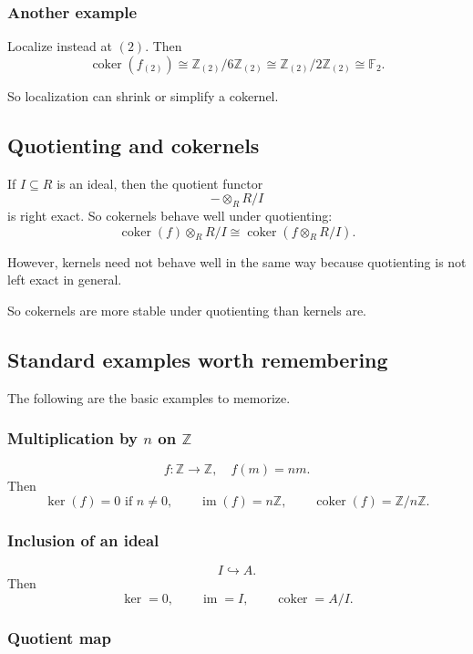 \documentclass[12pt,a4paper]{article}
\theoremstyle{notespace}
\theoremstyle{definition}
\begin{document}
\subsubsection*{Another example}

Localize instead at \((2)\). Then
\[
\operatorname{coker}(f_{(2)})\cong \mathbb Z_{(2)}/6\mathbb Z_{(2)}\cong \mathbb Z_{(2)}/2\mathbb Z_{(2)}\cong \mathbb F_2.
\]

So localization can shrink or simplify a cokernel.

\subsection{ Quotienting and cokernels}

If \(I\subseteq R\) is an ideal, then the quotient functor
\[
-\otimes_R R/I
\]
is right exact.
So cokernels behave well under quotienting:
\[
\operatorname{coker}(f)\otimes_R R/I
\cong
\operatorname{coker}(f\otimes_R R/I).
\]

However, kernels need not behave well in the same way because quotienting is not left exact in general.

So cokernels are more stable under quotienting than kernels are.

\subsection{ Standard examples worth remembering}

The following are the basic examples to memorize.

\subsubsection*{Multiplication by \(n\) on \(\mathbb Z\)}

\[
f:\mathbb Z\to\mathbb Z,\quad f(m)=nm.
\]
Then
\[
\ker(f)=0 \text{ if } n\neq 0,
\qquad
\operatorname{im}(f)=n\mathbb Z,
\qquad
\operatorname{coker}(f)=\mathbb Z/n\mathbb Z.
\]

\subsubsection*{Inclusion of an ideal}

\[
I\hookrightarrow A.
\]
Then
\[
\ker=0,
\qquad
\operatorname{im}=I,
\qquad
\operatorname{coker}=A/I.
\]

\subsubsection*{Quotient map}
\end{document}
